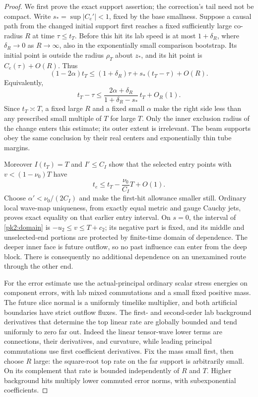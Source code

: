 \begin{proof}
We first prove the exact support assertion; the correction's tail
need not be compact. Write $s_* =\sup|C_e'|<1$, fixed by the base
smallness. Suppose a causal path from the changed initial support
first reaches a fixed sufficiently large co-radius $R$ at time
$\tau\le t_T$. Before this hit its lab speed is at most
$1+\delta_R$, where $\delta_R\to0$ as $R\to\infty$, also in the
exponentially small comparison bootstrap. Its initial point is
outside the radius $\rho_T$ about $z_*$, and its hit point is
$C_e(\tau)+O(R)$. Thus
\begin{equation}
 (1-2\alpha)t_T
 \le(1+\delta_R)\tau+s_*(t_T-\tau)+O(R).
 \label{pk2:first-hit}
\end{equation}
Equivalently,
\begin{equation}
 t_T-\tau\le
   \frac{2\alpha+\delta_R}{1+\delta_R-s_*}\,t_T+O_R(1).
 \label{pk2:late-first-hit}
\end{equation}
Since $t_T\asymp T$, a fixed large $R$ and a fixed small $\alpha$
make the right side less than any prescribed small multiple of
$T$ for large $T$. Only the inner exclusion radius of the change
enters this estimate; its outer extent is irrelevant. The beam
supports obey the same conclusion by their real centers and
exponentially thin tube margins.

Moreover $I(t_T)=T$ and $I'\le C_I$ show that the selected entry
points with $v<(1-\nu_0)T$ have
\[
 t_e\le t_T-\frac{\nu_0}{C_I}T+O(1).
\]
Choose $\alpha'<\nu_0/(2C_I)$ and make the first-hit allowance
smaller still. Ordinary local wave-map uniqueness, from exactly
equal metric and gauge Cauchy jets, proves exact equality on that
earlier entry interval. On $s=0$, the interval of
\eqref{pk2:domain} is $-u_2\le v\le T+c_2$; its negative part
is fixed, and its middle and unselected-end portions are protected
by finite-time domain of dependence. The deeper inner face is
future outflow, so no past influence can enter from the deep block.
There is consequently no additional dependence on an unexamined
route through the other end.

For the error estimate use the actual-principal ordinary scalar
stress energies on component errors, with lab mixed commutations
and a small fixed positive mass. The future slice normal is a
uniformly timelike multiplier, and both artificial boundaries
have strict outflow fluxes. The first- and second-order lab
background derivatives that determine the top linear rate are
globally bounded and tend uniformly to zero far out. Indeed the
linear tensor-wave lower terms are connections, their derivatives,
and curvature, while leading principal commutations use first
coefficient derivatives. Fix the mass small first, then choose
$R$ large: the square-root top rate on the far support is
arbitrarily small. On its complement that rate is bounded
independently of $R$ and $T$. Higher background hits multiply
lower commuted error norms, with subexponential coefficients.


\end{proof}
